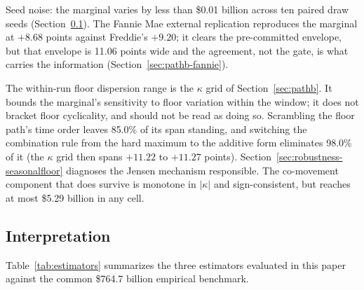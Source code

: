 \documentclass[12pt]{article}
\begin{document}
\begin{table}[H]
\begin{threeparttable}
\begin{tabular}{@{}p{2.4cm}p{3.3cm}p{4.0cm}p{4.8cm}@{}}
\bottomrule
\end{tabular}
\begin{tablenotes}[flushleft]\footnotesize
\item Seed noise: the marginal varies by less than \$0.01 billion across ten paired draw seeds (Section~\ref{sec:hazard-interp}). The Fannie Mae external replication reproduces the marginal at $+8.68$ points against Freddie's $+9.20$; it clears the pre-committed envelope, but that envelope is 11.06 points wide and the agreement, not the gate, is what carries the information (Section~\ref{sec:pathb-fannie}).
\item The within-run floor dispersion range is the $\kappa$ grid of Section~\ref{sec:pathb}. It bounds the marginal's sensitivity to floor variation within the window; it does not bracket floor cyclicality, and should not be read as doing so. Scrambling the floor path's time order leaves 85.0\% of its span standing, and switching the combination rule from the hard maximum to the additive form eliminates 98.0\% of it (the $\kappa$ grid then spans $+11.22$ to $+11.27$ points). Section~\ref{sec:robustness-seasonalfloor} diagnoses the Jensen mechanism responsible. The co-movement component that does survive is monotone in $|\kappa|$ and sign-consistent, but reaches at most \$5.29 billion in any cell.
\end{tablenotes}
\end{threeparttable}
\end{table}

\subsection{Interpretation}\label{sec:hazard-interp}

Table~\ref{tab:estimators} summarizes the three estimators evaluated in this paper against the common \$764.7 billion empirical benchmark.
\end{document}
